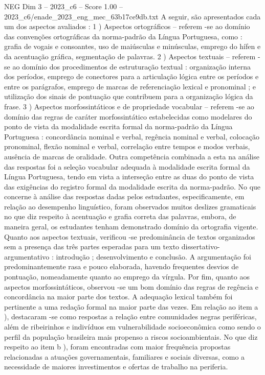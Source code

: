 \begin{textsample}{NEG Dim 3 – 2023\_c6 – Score 1.00 – 2023\_c6/enade\_2023\_eng\_mec\_63b17ce9db.txt}
A seguir, são apresentados cada um dos aspectos avaliados : 1 ) Aspectos ortográficos – referem -se ao domínio das convenções ortográficas da norma-padrão da Língua Portuguesa, como : grafia de vogais e consoantes, uso de maiúsculas e minúsculas, emprego do hífen e da acentuação gráfica, segmentação de palavras. 2 ) Aspectos textuais – referem -se ao domínio dos procedimentos de estruturação textual : organização interna dos períodos, emprego de conectores para a articulação lógica entre os períodos e entre os parágrafos, emprego de marcas de referenciação lexical e pronominal ; e utilização dos sinais de pontuação que contribuem para a organização lógica da frase. 3 ) Aspectos morfossintáticos e de propriedade vocabular – referem -se ao domínio das regras de caráter morfossintático estabelecidas como modelares do ponto de vista da modalidade escrita formal da norma-padrão da Língua Portuguesa : concordância nominal e verbal, regência nominal e verbal, colocação pronominal, flexão nominal e verbal, correlação entre tempos e modos verbais, ausência de marcas de oralidade.
Outra competência combinada a esta na análise das respostas foi a seleção vocabular adequada à modalidade escrita formal da Língua Portuguesa, tendo em vista a interseção entre as duas do ponto de vista das exigências do registro formal da modalidade escrita da norma-padrão.
No que concerne à análise das respostas dadas pelos estudantes, especificamente, em relação ao desempenho linguístico, foram observados muitos deslizes gramaticais no que diz respeito à acentuação e grafia correta das palavras, embora, de maneira geral, os estudantes tenham demonstrado domínio da ortografia vigente.
Quanto aos aspectos textuais, verificou -se predominância de textos organizados sem a presença das três partes esperadas para um texto dissertativo-argumentativo : introdução ; desenvolvimento e conclusão.
A argumentação foi predominantemente rasa e pouco elaborada, havendo frequentes desvios de pontuação, nomeadamente quanto ao emprego da vírgula.
Por fim, quanto aos aspectos morfossintáticos, observou -se um bom domínio das regras de regência e concordância na maior parte dos textos.
A adequação lexical também foi pertinente a uma redação formal na maior parte das vezes.
Em relação ao item a ), destacaram -se como respostas a relação entre comunidades negras periféricas, além de ribeirinhos e indivíduos em vulnerabilidade socioeconômica como sendo o perfil da população brasileira mais propenso a riscos socioambientais.
No que diz respeito ao item b ), foram encontradas com maior frequência propostas relacionadas a atuações governamentais, familiares e sociais diversas, como a necessidade de maiores investimentos e ofertas de trabalho na periferia.

\end{textsample}

